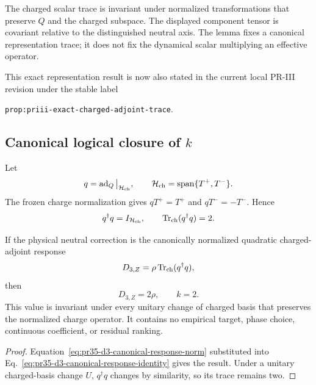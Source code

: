 The charged scalar trace is invariant under normalized transformations that preserve $Q$ and the charged subspace.  The displayed component tensor is covariant relative to the distinguished neutral axis.  The lemma fixes a canonical representation trace; it does not fix the dynamical scalar
multiplying an effective operator.

This exact representation result is now also stated in the current local PR-III revision under the stable label
\begin{center}
\texttt{prop:priii-exact-charged-adjoint-trace}.
\end{center}

\subsection{Canonical logical closure of \texorpdfstring{$k$}{k}}

Let
\begin{equation}
 q=\operatorname{ad}_Q\big|_{\mathcal H_{\rm ch}},
 \qquad \mathcal H_{\rm ch}=\operatorname{span}\{T^+,T^-\}.
\end{equation}
The frozen charge normalization gives
$qT^+=T^+$ and $qT^-=-T^-$.  Hence
\begin{equation}
 q^\dagger q=I_{\mathcal H_{\rm ch}},
 \qquad
 \operatorname{Tr}_{\rm ch}(q^\dagger q)=2.
 \label{eq:pr35-d3-canonical-response-norm}
\end{equation}

\begin{proposition}
\label{prop:pr35-d3-direct-k-value}
If the physical neutral correction is the canonically normalized quadratic charged-adjoint response
\begin{equation}
 D_{3,Z}=\rho\operatorname{Tr}_{\rm ch}(q^\dagger q),
 \label{eq:pr35-d3-canonical-response-identity}
\end{equation}
then
\begin{equation}
 D_{3,Z}=2\rho,
 \qquad k=2.
\end{equation}
This value is invariant under every unitary change of charged basis that preserves the normalized charge operator.  It contains no empirical target, phase choice, continuous coefficient, or residual ranking.
\end{proposition}

\begin{proof}
Equation~\eqref{eq:pr35-d3-canonical-response-norm} substituted into Eq.~\eqref{eq:pr35-d3-canonical-response-identity} gives the result.  Under a unitary charged-basis change $U$, $q^\dagger q$ changes by similarity, so its trace remains two.
\end{proof}


